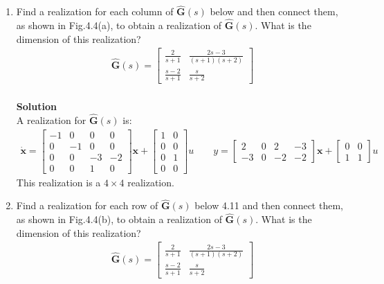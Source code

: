 \documentclass[11pt]{article}
\begin{document}
\begin{enumerate}
	\newpage
	\item{Find a realization for each column of $\hat{\mathbf{G}}(s)$ below and then connect them, as shown in Fig.4.4(a), to obtain a realization of $\hat{\mathbf{G}}(s)$.  What is the dimension of this realization?
		\begin{align*}
			\hat{\mathbf{G}}(s)=\left[\begin{array}{cc}\frac{2}{s+1} & \frac{2s-3}{(s+1)(s+2)} \\\frac{s-2}{s+1} & \frac{s}{s+2}\end{array}\right]
		\end{align*}
	\\
	
	\textbf{Solution}\\
	A realization for $\hat{\mathbf{G}}(s)$ is:
	\begin{align*}
		\dot{\mathbf{x}}=\left[\begin{array}{cc|cc}-1 & 0 & 0 & 0 \\0 & -1 & 0 & 0 \\\hline 0 & 0 & -3 & -2 \\0 & 0 & 1 & 0\end{array}\right]\mathbf{x}+\left[\begin{array}{cc}1 & 0 \\0 & 0 \\0 & 1 \\0 & 0\end{array}\right]u \quad \quad y=\left[\begin{array}{cc|cc}2 & 0 & 2 & -3 \\-3 & 0 & -2 & -2\end{array}\right]\mathbf{x}+\left[\begin{array}{cc}0 & 0 \\1 & 1\end{array}\right]u
	\end{align*}
	This realization is a $4\times4$ realization.
	}
	
	\newpage
	\item{Find a realization for each row of $\hat{\mathbf{G}}(s)$ below 4.11 and then connect them, as shown in Fig.4.4(b), to obtain a realization of $\hat{\mathbf{G}}(s)$.  What is the dimension of this realization?
		\begin{align*}
			\hat{\mathbf{G}}(s)=\left[\begin{array}{cc}\frac{2}{s+1} & \frac{2s-3}{(s+1)(s+2)} \\\frac{s-2}{s+1} & \frac{s}{s+2}\end{array}\right]
		\end{align*}
	\\
	
}
\end{enumerate}
\end{document}
